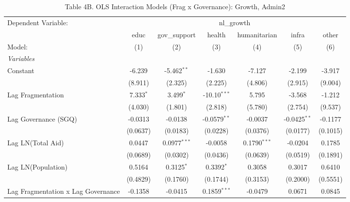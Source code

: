 \begin{table}[htbp]
   \caption{Table 4B. OLS Interaction Models (Frag x Governance): Growth, Admin2}
   \centering
   \begin{tabular}{lcccccc}
      \tabularnewline \midrule \midrule
      Dependent Variable: & \multicolumn{6}{c}{nl\_growth}\\
                                         & educ        & gov\_support   & health         & humanitarian   & infra          & other \\   
      Model:                             & (1)         & (2)            & (3)            & (4)            & (5)            & (6)\\  
      \midrule
      \emph{Variables}\\
      Constant                           & -6.239      & -5.462$^{**}$  & -1.630         & -7.127         & -2.199         & -3.917\\   
                                         & (8.911)     & (2.325)        & (2.225)        & (4.806)        & (2.915)        & (9.004)\\   
      Lag Fragmentation                  & 7.333$^{*}$ & 3.499$^{*}$    & -10.10$^{***}$ & 5.795          & -3.568         & -1.212\\   
                                         & (4.030)     & (1.801)        & (2.818)        & (5.780)        & (2.754)        & (9.537)\\   
      Lag Governance (SGQ)               & -0.0313     & -0.0138        & -0.0579$^{**}$ & -0.0037        & -0.0425$^{**}$ & -0.1177\\   
                                         & (0.0637)    & (0.0183)       & (0.0228)       & (0.0376)       & (0.0177)       & (0.1015)\\   
      Lag LN(Total Aid)                  & 0.0447      & 0.0977$^{***}$ & -0.0058        & 0.1790$^{***}$ & -0.0204        & 0.1785\\   
                                         & (0.0689)    & (0.0302)       & (0.0436)       & (0.0639)       & (0.0519)       & (0.1891)\\   
      Lag LN(Population)                 & 0.5164      & 0.3125$^{*}$   & 0.3392$^{*}$   & 0.3058         & 0.3017         & 0.6410\\   
                                         & (0.4829)    & (0.1760)       & (0.1744)       & (0.3153)       & (0.2000)       & (0.5551)\\   
      Lag Fragmentation x Lag Governance & -0.1358     & -0.0415        & 0.1859$^{***}$ & -0.0479        & 0.0671         & 0.0845\\   

\end{tabular}
\end{table}
